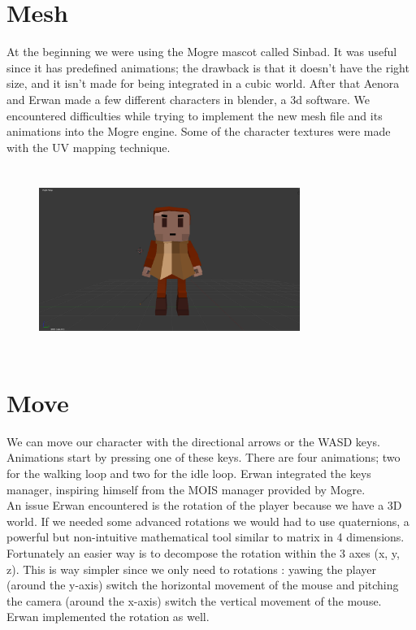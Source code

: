\documentclass[article]{report} %
\begin{document}
			\section{Mesh}
				At the beginning we were using the \ac{Mogre} mascot called Sinbad. It was useful since it has predefined animations; the drawback is that it doesn't have the right size, and it isn't made for being integrated in a cubic world. After that Aenora and Erwan made a few different characters in blender, a 3d software. We encountered difficulties while trying to implement the new mesh file and its animations into the \ac{Mogre} engine. Some of the character textures were made with the UV mapping technique.
				\begin{figure}[h]
					\includegraphics[width=8.5cm,   height=6cm]{images/Graphics/face_col.PNG}
				\end{figure}
			\section{Move}
				We can move our character with the directional arrows or the WASD keys. Animations start by pressing one of these keys. There are four animations; two for the walking loop and two for the idle loop. Erwan integrated the keys manager, inspiring himself from the MOIS manager provided by \ac{Mogre}.\\

An issue Erwan encountered is the rotation of the player because we have a 3D world. If we needed some advanced rotations we would had to use quaternions, a powerful but non-intuitive mathematical tool similar to matrix in 4 dimensions. Fortunately an easier way is to decompose the rotation within the 3 axes (x, y, z). This is way simpler since we only need to rotations : yawing the player (around the y-axis) switch the horizontal movement of the mouse and pitching the camera (around the x-axis) switch the vertical movement of the mouse. Erwan implemented the rotation as well.
\end{document}

